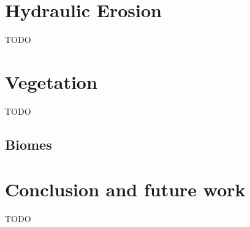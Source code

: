 \documentclass[journal, letterpaper]{IEEEtran}
\begin{document}
\section{Hydraulic Erosion}\label{HydraulicErosion}
TODO

\section{Vegetation}\label{Vegetation}
TODO
\subsection{Biomes}\label{Biomes}

\section{Conclusion and future work}
TODO


%

\end{document}
